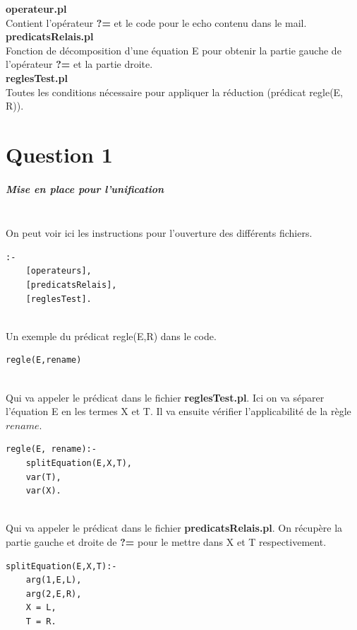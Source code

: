 \documentclass[10pt,a4paper]{report}
\begin{document}
\begin{center}
\textbf{operateur.pl}\\
Contient l'opérateur \textbf{?=} et le code pour le echo contenu dans le mail.\\[1cm]
\textbf{predicatsRelais.pl}\\
Fonction de décomposition d'une équation E pour obtenir la partie gauche de
l'opérateur \textbf{?=} et la partie droite.\\[1cm]
\textbf{reglesTest.pl}\\
Toutes les conditions nécessaire pour appliquer la réduction (prédicat regle(E, R)).\\[1cm]
\end{center}





\chapter*{Question 1}
\paragraph{Mise en place pour l'unification} ~\\
On peut voir ici les instructions pour l'ouverture des différents fichiers.
\begin{lstlisting}[caption ={Ouverture des fichiers dans $main.pl$}]
:-
	[operateurs],
	[predicatsRelais],
	[reglesTest].
\end{lstlisting} ~\\
Un exemple du prédicat regle(E,R) dans le code.
\begin{lstlisting}[caption ={regle dans le fichier $main.pl$}]
regle(E,rename)
\end{lstlisting} ~\\
Qui va appeler le prédicat dans le fichier \textbf{reglesTest.pl}. Ici on va séparer l'équation E en les termes X et T. Il va ensuite vérifier l'applicabilité de la règle $rename$.
\begin{lstlisting}[caption ={regle dans le fichier $reglesTest.pl$}]
regle(E, rename):-
	splitEquation(E,X,T),
	var(T),
	var(X).
\end{lstlisting} ~\\
Qui va appeler le prédicat dans le fichier \textbf{predicatsRelais.pl}. On récupère la partie gauche et droite de \textbf{?=} pour le mettre dans X et T respectivement.
\begin{lstlisting}[caption ={splitEquation dans le fichier $predicatsRelais.pl$}]
splitEquation(E,X,T):-
	arg(1,E,L),
	arg(2,E,R),
	X = L,
	T = R.
\end{lstlisting}
\end{document}
